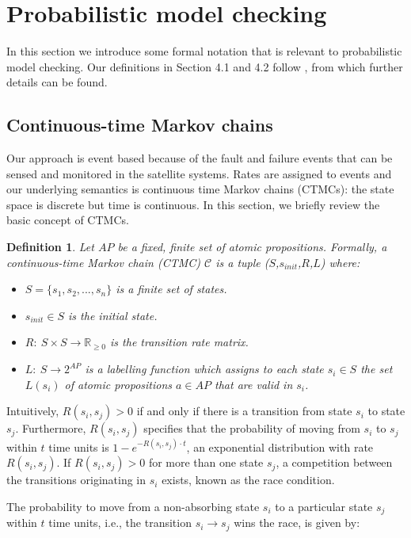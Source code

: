\documentclass[preprint,12pt]{qrei}
\newtheorem{mydef}{Definition}
\begin{document}
\section{Probabilistic model checking}\label{sect:pmc}

In this section we introduce some formal notation that is relevant to probabilistic model checking. Our definitions in Section 4.1 and 4.2 follow \cite{BK08}, from which further details can be found.

\subsection{Continuous-time Markov chains}

Our approach is event based because of the fault and failure events that can be sensed and monitored in the satellite systems. Rates are assigned to events and our underlying semantics is continuous time Markov chains (CTMCs): the state space is discrete but time is continuous. In this section, we briefly review the basic concept of CTMCs.

\begin{mydef}\label{def:ctmc}
Let $AP$ be a fixed, finite set of atomic propositions. Formally, a continuous-time Markov chain (CTMC) $\mathcal{C}$ is a tuple ($S$,$s_{init}$,$R$,$L$) where:
\begin{itemize}
\item $S=\{s_{1},s_{2},...,s_{n}\}$ is a finite set of states.
\item $s_{init}\in S$ is the initial state.
\item $R:\ S\times S\rightarrow \mathbb{R}_{\geq 0}$ is the transition rate matrix.
\item $L:\ S\rightarrow 2^{AP}$ is a labelling function which assigns to each state $s_{i}\in S$ the set $L(s_{i})$ of atomic propositions $a\in AP$ that are valid in $s_{i}$.
\end{itemize}
\end{mydef}

Intuitively, $R(s_{i},s_{j})>0$ if and only if there is a transition from state $s_{i}$ to state $s_{j}$. Furthermore, $R(s_{i},s_{j})$ specifies that the probability of moving from $s_{i}$ to $s_{j}$ within $t$ time units is $1-e^{-R(s_{i},s_{j})\cdot t}$, an exponential distribution with rate $R(s_{i},s_{j})$. If $R(s_{i},s_{j})>0$ for more than one state $s_{j}$, a competition between the transitions originating in $s_{i}$ exists, known as the race condition. 

The probability to move from a non-absorbing state $s_{i}$ to a particular state $s_{j}$ within $t$ time units, i.e., the transition $s_{i}\rightarrow s_{j}$ wins the race, is given by:
\end{document}
